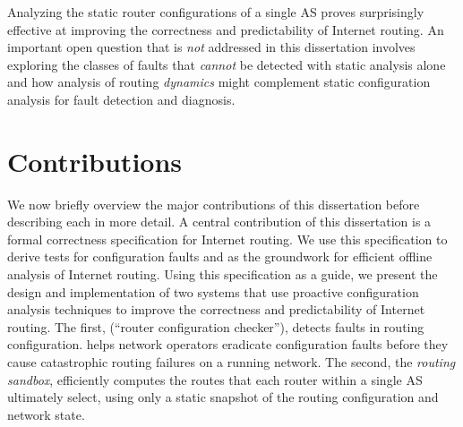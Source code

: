 
Analyzing the static router configurations of a single AS proves
surprisingly effective at improving the correctness and predictability
of Internet routing.  An important open question that is {\em not}
addressed in this dissertation involves
exploring the classes of faults that {\em cannot} be detected with
static analysis alone and how analysis of routing {\em dynamics} might
complement static configuration analysis for fault detection and diagnosis.





\section{Contributions}\label{sec:contributions} 

We now briefly overview the major contributions of this dissertation
before describing each in more detail.  A central contribution of this
dissertation is a formal correctness specification for Internet routing.
We use this specification to derive tests for configuration faults and
as the groundwork for efficient offline analysis of Internet routing.
Using this specification as a guide, we present the design and
implementation of two systems that use proactive configuration analysis
techniques to improve the correctness and predictability of Internet
routing.  The first, \rcc (``router configuration checker''), detects
faults in routing configuration. \rcc helps network operators eradicate
configuration faults before they cause catastrophic routing failures on
a running network. The second, the {\em routing sandbox}, efficiently computes
the routes that each router within a single AS ultimately select, using
only a static snapshot of the routing configuration and network state.

